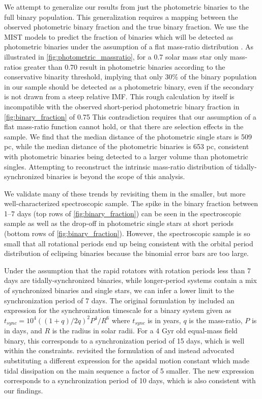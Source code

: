 \documentclass[manuscript]{aastex6}
\begin{document}
We attempt to generalize our results from just the photometric binaries to the
full binary population. This generalization requires a mapping between the
observed photometric binary fraction and the true binary fraction. We use the
MIST models to predict the fraction of binaries which will be detected as
photometric binaries under the assumption of a flat mass-ratio distribution
\citep{Raghavan10}. As illustrated in \cref{fig:photometric_massratio}, for a 
0.7 solar mass star only mass-ratios greater than 0.70 result in photometric
binaries according to the conservative binarity threshold, implying that only
30\% of the binary population in our sample should be detected as a photometric 
binary, even if the secondary is not drawn from a steep relative IMF. This rough 
calculation by itself is incompatible with the observed 
short-period photometric binary fraction in \cref{fig:binary_fraction} of 0.75
This contradiction requires that our assumption of a flat mass-ratio function 
cannot hold, or that there are selection effects in the sample. We find that
the median distance of the photometric single stars is 509 pc, while the median
distance of the photometric binaries is 653 pc, consistent with photometric 
binaries being detected to a larger volume than photometric singles. Attempting 
to reconstruct the intrinsic mass-ratio distribution of tidally-synchronized 
binaries is beyond the scope of this analysis.

We validate many of these trends by revisiting them in the smaller, but more
well-characterized spectroscopic sample. The spike in the binary fraction
between 1--7 days (top rows of \cref{fig:binary_fraction}) can be seen in the 
spectroscopic sample as well as the drop-off in photometric single stars at
short periods (bottom rows of \cref{fig:binary_fraction}). However, the
spectroscopic sample is so small that all rotational periods end up being
consistent with the orbital period distribution of eclipsing binaries because
the binomial error bars are too large.

Under the assumption that the rapid rotators with rotation periods less than 7
days are tidally-synchronized binaries, while longer-period systems contain a
mix of synchronized binaries and single stars, we can infer a lower limit
to the synchronization period of 7 days. The original formulation by
\citep{Zahn77} included an expression for the synchronization timescale for a
binary system given as \(t_{sync} = 10^4 ((1+q)/2q)^2 P^4 / R^6\) where \(t_{sync}\) is
in years, \(q\) is the mass-ratio, \(P\) is in days, and \(R\) is the radius in
solar radii. For a 4 Gyr old equal-mass field binary, this
corresponds to a synchronization period of 15 days, which is well within the
constraints. \citet{Claret97} revisited the formulation of \citet{Zahn77} and
instead advocated substituting a different expression for the apsidal motion 
constant which made tidal dissipation on the main sequence a factor of 5
smaller. The new expression corresponds to a synchronization period of 10 days,
which is also consistent with our findings.
\end{document}

